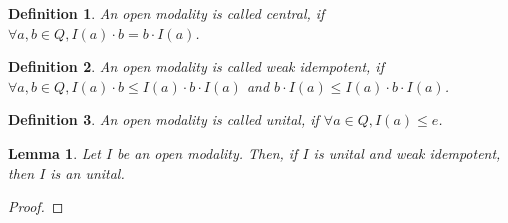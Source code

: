 \documentclass[a4paper]{article}
\newtheorem{lemma}{Lemma}
\newtheorem{defin}{Definition}
\begin{document}
\begin{defin}
  An open modality is called central, if $\forall a, b \in Q, I(a) \cdot b = b \cdot I(a)$.
\end{defin}

\begin{defin}
  An open modality is called weak idempotent, if $\forall a, b \in Q, I(a) \cdot b \leq I(a) \cdot b \cdot I(a)$ and
  $b \cdot I(a) \leq I(a) \cdot b \cdot I(a)$.
\end{defin}

\begin{defin}
  An open modality is called unital, if $\forall a \in Q, I(a) \leq e$.
\end{defin}

\begin{lemma}
  Let $I$ be an open modality. Then, if $I$ is unital and weak idempotent, then $I$ is an unital.
\end{lemma}

\begin{proof}
\end{proof}
\end{document}
